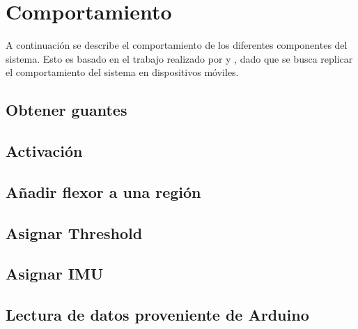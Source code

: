 \section{Comportamiento}
A continuación se describe el comportamiento de los diferentes componentes del sistema. Esto es basado en el trabajo realizado por \cite{tesis-meneses-sebastian} y \cite{tesis-cerda-rodrigo}, dado que se busca replicar el comportamiento del sistema en dispositivos móviles.

\subsection{Obtener guantes}
\subsection{Activación}

\subsection{Añadir flexor a una región}
\subsection{Asignar Threshold}
\subsection{Asignar IMU}
\subsection{Lectura de datos proveniente de Arduino}